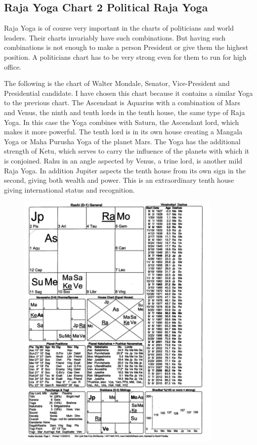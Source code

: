  

\subsection{Raja Yoga Chart 2
Political Raja Yoga}
 

Raja Yoga is of course very important in the charts of politicians and world leaders. Their charts invariably have such combinations. But having such combinations is not enough to make a person President or give them the highest position. A politicians chart has to be very strong even for them to run for high office.

 

The following is the chart of Walter Mondale, Senator, Vice-President and Presidential candidate. I have chosen this chart because it contains a similar Yoga to the previous chart. The Ascendant is Aquarius with a combination of Mars and Venus, the ninth and tenth lords in the tenth house, the same type of Raja Yoga. In this case the Yoga combines with Saturn, the Ascendant lord, which makes it more powerful. The tenth lord is in its own house creating a Mangala Yoga or Maha Purusha Yoga of the planet Mars. The Yoga has the additional strength of Ketu, which serves to carry the influence of the planets with which it is conjoined. Rahu in an angle aspected by Venus, a trine lord, is another mild Raja Yoga. In addition Jupiter aspects the tenth house from its own sign in the second, giving both wealth and power. This is an extraordinary tenth house giving international status and recognition.

 \begin{figure}[h]
\centering
\includegraphics[width=10cm]{pics/Mondale-1.jpg}
\caption{}
\end{figure}

